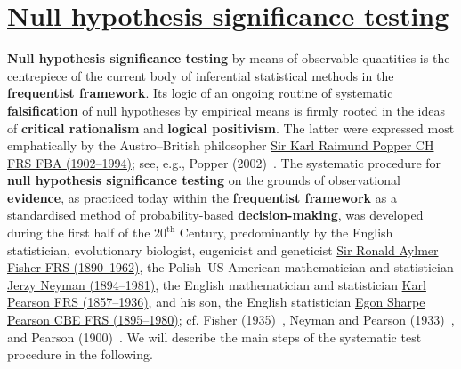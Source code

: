 \chapter[Null hypothesis significance testing]{\href{https://www.youtube.com/watch?v=jnLHSyYQ1LE}{Null hypothesis significance testing}}
\textbf{Null hypothesis significance testing} by means of
observable quantities is the centrepiece of the current body of
inferential statistical methods in the \textbf{frequentist
framework}. Its logic of an ongoing routine of systematic
\textbf{falsification} of null hypotheses by empirical means is
firmly rooted in the ideas of \textbf{critical rationalism} and
\textbf{logical positivism}. The latter were expressed most
emphatically by the Austro--British 
philosopher \href{http://en.wikipedia.org/wiki/Karl_Popper}{Sir 
Karl Raimund Popper CH FRS FBA (1902--1994)}; see, e.g., Popper 
(2002)~. The systematic procedure for \textbf{null
hypothesis significance testing} on the grounds of observational
\textbf{evidence}, as practiced today within the
\textbf{frequentist framework} as a standardised method of
probability-based \textbf{decision-making}, was developed during
the first half of the $20^\mathrm{th}$ Century, predominantly by
the English statistician, evolutionary biologist, 
eugenicist and geneticist
\href{http://www-history.mcs.st-and.ac.uk/Biographies/Fisher.html}{Sir
Ronald Aylmer Fisher FRS (1890--1962)}, the 
Polish--US-American mathematician and statistician
\href{http://www-history.mcs.st-and.ac.uk/Biographies/Neyman.html}{Jerzy Neyman (1894--1981)}, the English mathematician and statistician
\href{http://www-history.mcs.st-and.ac.uk/Biographies/Pearson.html}{Karl Pearson FRS (1857--1936)}, and his son, the English statistician
\href{http://www-history.mcs.st-and.ac.uk/Biographies/Pearson_Egon.html}{Egon Sharpe Pearson CBE FRS (1895--1980)}; cf. Fisher
(1935)~, Neyman and Pearson (1933)~,
and Pearson (1900)~.
We will describe the main steps of the systematic test procedure 
in the following.

